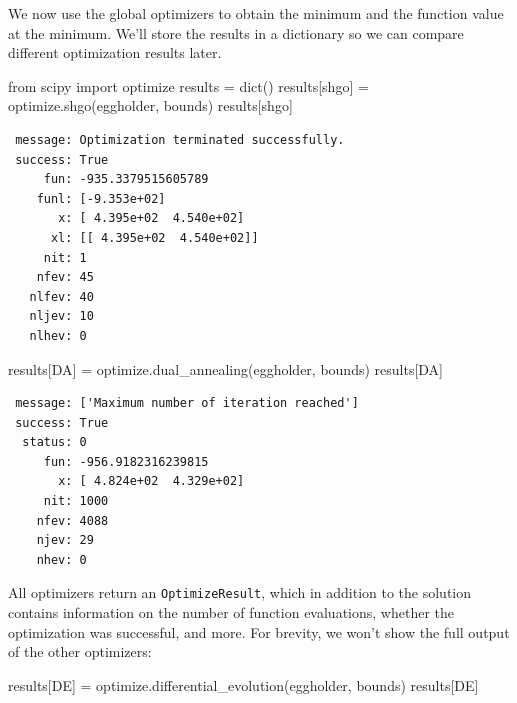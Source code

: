\documentclass[
  letterpaper,
  DIV=11,
  numbers=noendperiod]{scrreprt}
\newenvironment{Shaded}{\begin{snugshade}}{\end{snugshade}}
\newcommand{\BuiltInTok}[1]{\textcolor[rgb]{0.00,0.23,0.31}{#1}}
\newcommand{\ImportTok}[1]{\textcolor[rgb]{0.00,0.46,0.62}{#1}}
\newcommand{\NormalTok}[1]{\textcolor[rgb]{0.00,0.23,0.31}{#1}}
\newcommand{\OperatorTok}[1]{\textcolor[rgb]{0.37,0.37,0.37}{#1}}
\newcommand{\StringTok}[1]{\textcolor[rgb]{0.13,0.47,0.30}{#1}}
\begin{document}
We now use the global optimizers to obtain the minimum and the function
value at the minimum. We'll store the results in a dictionary so we can
compare different optimization results later.

\begin{Shaded}
\begin{Highlighting}[]
\ImportTok{from}\NormalTok{ scipy }\ImportTok{import}\NormalTok{ optimize}
\NormalTok{results }\OperatorTok{=} \BuiltInTok{dict}\NormalTok{()}
\NormalTok{results[}\StringTok{\textquotesingle{}shgo\textquotesingle{}}\NormalTok{] }\OperatorTok{=}\NormalTok{ optimize.shgo(eggholder, bounds)}
\NormalTok{results[}\StringTok{\textquotesingle{}shgo\textquotesingle{}}\NormalTok{]}
\end{Highlighting}
\end{Shaded}

\begin{verbatim}
 message: Optimization terminated successfully.
 success: True
     fun: -935.3379515605789
    funl: [-9.353e+02]
       x: [ 4.395e+02  4.540e+02]
      xl: [[ 4.395e+02  4.540e+02]]
     nit: 1
    nfev: 45
   nlfev: 40
   nljev: 10
   nlhev: 0
\end{verbatim}

\begin{Shaded}
\begin{Highlighting}[]
\NormalTok{results[}\StringTok{\textquotesingle{}DA\textquotesingle{}}\NormalTok{] }\OperatorTok{=}\NormalTok{ optimize.dual\_annealing(eggholder, bounds)}
\NormalTok{results[}\StringTok{\textquotesingle{}DA\textquotesingle{}}\NormalTok{]}
\end{Highlighting}
\end{Shaded}

\begin{verbatim}
 message: ['Maximum number of iteration reached']
 success: True
  status: 0
     fun: -956.9182316239815
       x: [ 4.824e+02  4.329e+02]
     nit: 1000
    nfev: 4088
    njev: 29
    nhev: 0
\end{verbatim}

All optimizers return an \texttt{OptimizeResult}, which in addition to
the solution contains information on the number of function evaluations,
whether the optimization was successful, and more. For brevity, we won't
show the full output of the other optimizers:

\begin{Shaded}
\begin{Highlighting}[]
\NormalTok{results[}\StringTok{\textquotesingle{}DE\textquotesingle{}}\NormalTok{] }\OperatorTok{=}\NormalTok{ optimize.differential\_evolution(eggholder, bounds)}
\NormalTok{results[}\StringTok{\textquotesingle{}DE\textquotesingle{}}\NormalTok{]}
\end{Highlighting}
\end{Shaded}
\end{document}

